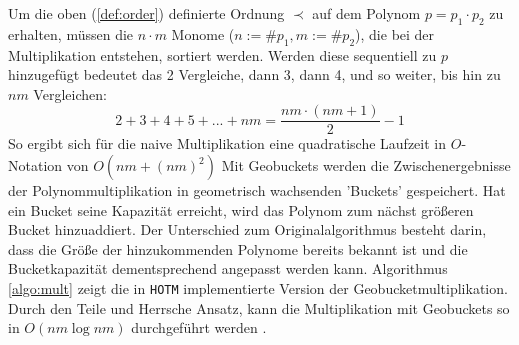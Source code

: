 Um die oben (\ref{def:order}) definierte Ordnung $\prec$ auf dem Polynom $p = p_1 \cdot p_2$ zu erhalten, müssen die $n\cdot m$ Monome ($n := \#p_1, m := \#p_2$), die bei der Multiplikation entstehen, sortiert werden. Werden diese sequentiell zu $p$ hinzugefügt bedeutet das 2 Vergleiche, dann 3, dann 4, und so weiter, bis hin zu $nm$ Vergleichen:
$$ 2 + 3 + 4 + 5 + ... + nm = \frac{nm \cdot (nm + 1)}{2} - 1$$
So ergibt sich für die naive Multiplikation eine quadratische Laufzeit in $O$-Notation von $O(nm + (nm)^2)$
Mit Geobuckets werden die Zwischenergebnisse der Polynommultiplikation in geometrisch wachsenden 'Buckets' gespeichert. Hat ein Bucket seine Kapazität erreicht, wird das Polynom zum nächst größeren Bucket hinzuaddiert. Der Unterschied zum Originalalgorithmus besteht darin, dass die Größe der hinzukommenden Polynome bereits bekannt ist und die Bucketkapazität dementsprechend angepasst werden kann. Algorithmus \ref{algo:mult} zeigt die in \verb+HOTM+ implementierte Version der Geobucketmultiplikation. Durch den Teile und Herrsche Ansatz, kann die Multiplikation mit Geobuckets so in $O(nm \log nm)$ durchgeführt werden \cite{geobucketsmulti}.





















